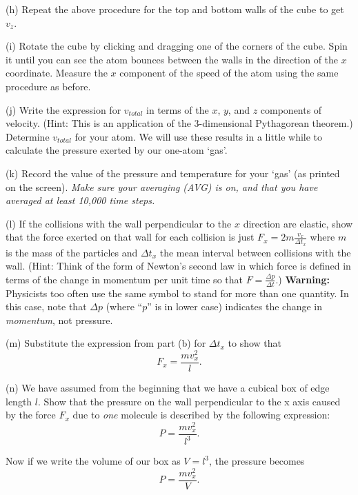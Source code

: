 \pagebreak[2]
(h) Repeat the above procedure for the top and bottom walls of the cube to get $v_z$.
\answerspace{15mm}

(i) Rotate the cube by clicking and dragging one of the corners of the cube.
Spin it until you can see the atom bounces between the walls in the direction of
the $x$ coordinate.
Measure the $x$ component of the speed of the atom using the same procedure as before.
\answerspace{15mm}

(j) Write the
expression for $v_{total}$ in terms of the $x$, $y$, and $z$ components
of velocity. (Hint: This is an application of the 3-dimensional Pythagorean
theorem.) Determine $v_{total}$ for your atom.
We will use these results in a little while to calculate the pressure exerted by
our one-atom `gas'.
\answerspace{15mm}

(k) Record the value of the pressure and temperature for your `gas' (as printed on the screen).  \textit{Make sure your averaging (AVG) is on, and that you have averaged at least 10,000 time steps.}
\answerspace{15mm}

(l) If the collisions with the wall perpendicular to the $x$ direction
are elastic, show that the force exerted on that wall for each collision
is just $F_{x}=2m\frac{v_{x}}{\Delta t_{x}}$ where $m$ is the mass
of the particles and $\Delta t_{x}$ the mean interval between
collisions with the wall. (Hint: Think of the form of Newton's second
law in which force is defined in terms of the change in momentum per
unit time so that $F=\frac{\Delta p}{\Delta t}$.) \textbf{Warning:} Physicists too often use the same symbol to stand
for more than one quantity. In this case, note that $\Delta p$
(where ``$p$'' is in lower case) indicates the change in \emph{momentum},
not pressure.
\answerspace{15mm}

(m) Substitute the expression from part (b) for $\Delta t_{x}$
to show that 
\[
F_{x}=\frac{mv_{x}^{2}}{l}.\]

\answerspace{15mm}

(n) We have assumed from the beginning that we have a cubical box of edge length $l$. Show that the pressure on the wall perpendicular to the x axis caused by
the force $F_{x}$ due to \emph{one} molecule is described by
the following expression:
\[
P=\frac{mv_{x}^{2}}{l^{3}}.\]

\answerspace{5mm}

\pagebreak[2]
Now if we write the volume of our box as $V=l^{3}$, the pressure becomes
\[
P=\frac{mv_{x}^{2}}{V}.\]

